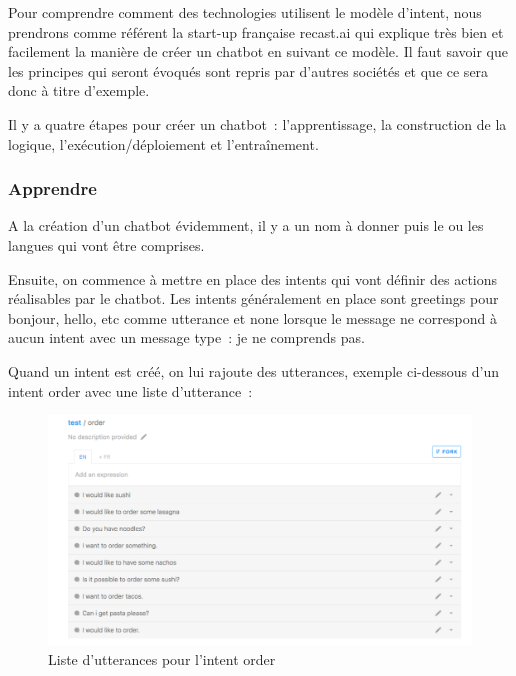 Pour comprendre comment des technologies utilisent le modèle d’intent, nous prendrons comme référent la start-up française recast.ai \cite{ref17} qui explique très bien et facilement la manière de créer un chatbot en suivant ce modèle. Il faut savoir que les principes qui seront évoqués sont repris par d’autres sociétés et que  ce sera donc à titre d’exemple.
\vspace{1em}

	Il y a quatre étapes pour créer un chatbot : l’apprentissage, la construction de la logique, l’exécution/déploiement et l’entraînement.


\subsubsection{Apprendre}


A la création d’un chatbot évidemment, il y a un nom à donner puis le ou les langues qui vont être comprises.
\vspace{1em}

	Ensuite, on commence à mettre en place des intents qui vont définir des actions réalisables par le chatbot. Les intents généralement en place sont greetings pour bonjour, hello, etc comme utterance et none lorsque le message ne correspond à aucun intent avec un message type : je ne comprends pas.
	\vspace{1em}

	Quand un intent est créé, on lui rajoute des utterances, exemple ci-dessous d’un intent order avec une liste d’utterance :
\vspace{1em}

\begin{figure}[H]
	\centering
		\includegraphics[width = \textwidth]{utterances.png}
	\caption{Liste d'utterances pour l'intent order}
	\label{fig:Liste d'utterances pour l'intent order}
\end{figure}
\vspace{1em}

